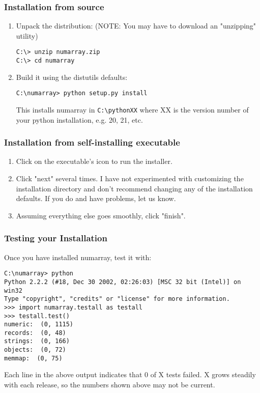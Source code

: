 \subsubsection{Installation from source}

\begin{enumerate}
\item Unpack the distribution: (NOTE: You may have to download an "unzipping"
   utility)
\begin{verbatim}
C:\> unzip numarray.zip 
C:\> cd numarray
\end{verbatim}
\item Build it using the distutils defaults:
\begin{verbatim}
C:\numarray> python setup.py install
\end{verbatim}
   This installs numarray in \texttt{C:\textbackslash{}pythonXX} where XX is the version
   number of your python installation, e.g. 20, 21, etc.
\end{enumerate}


\subsubsection{Installation from self-installing executable}

\begin{enumerate}
\item Click on the executable's icon to run the installer.
\item Click "next" several times.  I have not experimented with customizing the
   installation directory and don't recommend changing any of the installation
   defaults.  If you do and have problems, let us know.
\item Assuming everything else goes smoothly, click "finish".
\end{enumerate}


\subsubsection{Testing your Installation}

Once you have installed numarray, test it with:
\begin{verbatim}
C:\numarray> python
Python 2.2.2 (#18, Dec 30 2002, 02:26:03) [MSC 32 bit (Intel)] on win32
Type "copyright", "credits" or "license" for more information.
>>> import numarray.testall as testall
>>> testall.test()
numeric:  (0, 1115)
records:  (0, 48)
strings:  (0, 166)
objects:  (0, 72)
memmap:  (0, 75)
\end{verbatim}
Each line in the above output indicates that 0 of X tests failed.  X grows
steadily with each release, so the numbers shown above may not be current.


